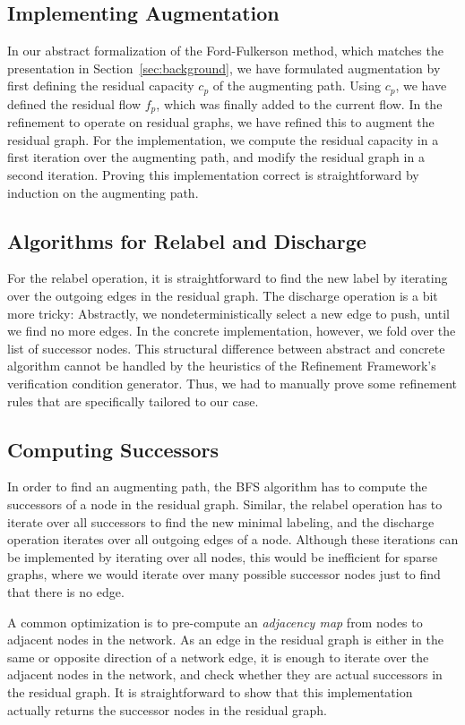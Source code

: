 \documentclass[smallcondensed]{svjour3}     %
\begin{document}
  \subsection{Implementing Augmentation}    
  In our abstract formalization of the Ford-Fulkerson method, which matches the presentation in Section~\ref{sec:background}, we have formulated augmentation by first defining 
  the residual capacity $c_p$ of the augmenting path. Using $c_p$, we have defined the residual flow $f_p$, which was finally added to the current flow.
  In the refinement to operate on residual graphs, we have refined this to augment the residual graph.
  For the implementation, we compute the residual capacity in a first iteration over the augmenting path, and modify the residual graph 
  in a second iteration. Proving this implementation correct is straightforward by induction on the augmenting path.
      
  \subsection{Algorithms for Relabel and Discharge}    
  For the relabel operation, it is straightforward to find the new label by iterating over the outgoing edges in the residual graph.
  The discharge operation is a bit more tricky: Abstractly, we nondeterministically select a new edge to push, until we find no more edges.
  In the concrete implementation, however, we fold over the list of successor nodes.
  This structural difference between abstract and concrete algorithm cannot be handled by the heuristics of the Refinement Framework's verification condition generator.
  Thus, we had to manually prove some refinement rules that are specifically tailored to our case.
      
  \subsection{Computing Successors}
  In order to find an augmenting path, the BFS algorithm has to compute the successors of a node in the residual graph. 
  Similar, the relabel operation has to iterate over all successors to find the new minimal labeling, and the discharge operation iterates over all outgoing edges of a node.
  Although these iterations can be implemented by iterating over all nodes, this would be inefficient for sparse graphs,
  where we would iterate over many possible successor nodes just to find that there is no edge. 
  
  A common optimization is to pre-compute an \emph{adjacency map} from nodes to adjacent nodes in the network. 
  As an edge in the residual graph is either in the same or opposite direction of 
  a network edge, it is enough to iterate over the adjacent nodes in the network, and check whether they are actual successors in the residual graph.
  It is straightforward to show that this implementation actually returns the successor nodes in the residual graph.
  
\end{document}
